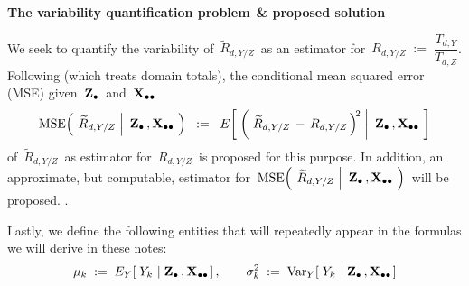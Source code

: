 \vskip 0.1cm
\begin{center}
\begin{minipage}{5.5in}
\begin{tcolorbox}[arc=8px, colback=white, colframe=black]
\begin{center}
\textbf{The variability quantification problem$\overset{{\color{white}1}}{\textnormal{\color{white}.}}$\& proposed solution}
\end{center}
We seek to quantify the variability of
\,$\widetilde{R}_{d,Y/Z}$\,
as an estimator for
\,$R_{d,Y/Z} \; := \; \dfrac{T_{d,Y}}{T_{d,Z}}$.
\vskip 0.1cm
Following \cite{Beaumont2011} (which treats domain totals),
the conditional mean squared error (MSE) given \,$\mathbf{Z}_{\bullet}$\, and \,$\mathbf{X}_{\bullet\bullet}$\,
\begin{equation*}
\textnormal{MSE}\!\left(\;
    \left.
    \widetilde{R}_{d,Y/Z}
    \;\right\vert\!
    \begin{array}{c} \mathbf{Z}_{\bullet}\,,\mathbf{X}_{\bullet\bullet} \end{array}
    \!\right)
\;\; := \;\;
    E\!\left[\;\left(\,
        \left.
        \widetilde{R}_{d,Y/Z}
        \, - \,
        R_{d,Y/Z}
        \,\right)^{\!2}
        \;\right\vert\!
        \begin{array}{c} \mathbf{Z}_{\bullet}\,,\mathbf{X}_{\bullet\bullet} \end{array}
        \!\right]
\end{equation*}
of
\,$\widetilde{R}_{d,Y/Z}$\,
as estimator for
\,$R_{d,Y/Z}$\,
is proposed for this purpose.
\vskip 0.3cm
\noindent
In addition, an approximate, but computable, estimator for
\,$
\textnormal{MSE}\!\left(\;
    \left.
    \widetilde{R}_{d,Y/Z}
    \;\right\vert\!
    \begin{array}{c} \mathbf{Z}_{\bullet}\,,\mathbf{X}_{\bullet\bullet} \end{array}
    \!\right)
$\,
will be proposed.
\vskip -0.25cm
{\color{white}.}
\end{tcolorbox}
\end{minipage}
\end{center}
\vskip 0.2cm
\noindent
Lastly, we define the following entities that will repeatedly appear
in the formulas we will derive in these notes:
\begin{equation*}
\mu_{k}
\; := \;
    E_{Y}\!\left[\;Y_{k}\,\left\vert\;\mathbf{Z}_{\bullet}\,,\mathbf{X}_{\bullet\bullet}\right.\right],
\quad\quad
\sigma_{k}^{2}
\; := \;
    \textnormal{Var}_{Y}\!\left[\;
        Y_{k}
        \,\left\vert\;
        \mathbf{Z}_{\bullet}\,,\mathbf{X}_{\bullet\bullet}
        \right.
        \right]
\end{equation*}
